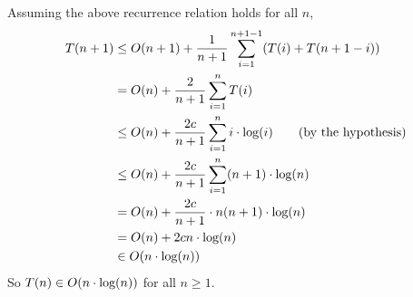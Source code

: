 \documentclass[11pt]{article}
\let\origleft\left
\let\origright\right
\renewcommand{\left}{\mathopen{}\mathclose\bgroup\origleft}
\renewcommand{\right}{\aftergroup\egroup\origright}
\newcommand{\p}[1]{\left(#1\right)}
\renewcommand{\log}[1]{\text{log}\p{#1}}
\newcommand{\BigOh}[1]{O\p{#1}}
\begin{document}
\begin{enumerate}[(a)]
Assuming the above recurrence relation holds for all $n$,
\begin{align*}
T(n+1) &\leq \BigOh{n+1} + \frac 1{n+1} \sum_{i=1}^{n+1-1} (T(i)+T(n+1-i)) \\
&= \BigOh{n} + \frac 2{n+1} \sum_{i=1}^n T(i) \\
&\leq \BigOh{n} + \frac{2c}{n+1} \sum_{i=1}^n i\cdot\log i \qquad \text{(by the hypothesis)}\\
&\leq \BigOh{n} + \frac{2c}{n+1} \sum_{i=1}^n (n+1)\cdot\log n \\
&= \BigOh{n} + \frac{2c}{n+1} \cdot n(n+1)\cdot\log n \\
&= \BigOh{n} + 2cn\cdot\log n \\
&\in \BigOh{n\cdot\log n}
\end{align*}
So $T(n) \in \BigOh{n\cdot\log n}$ for all $n\geq 1$.
\end{enumerate}


\newpage
\end{document}
